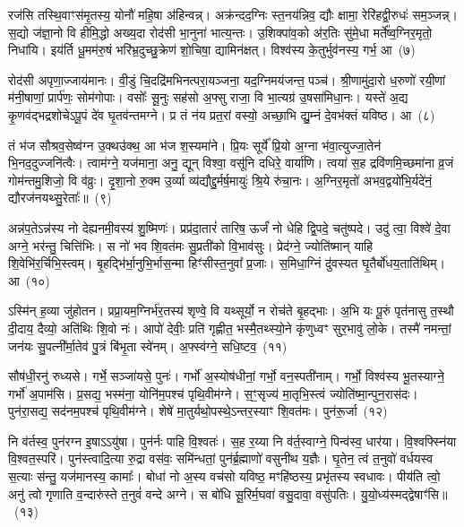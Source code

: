 रज॑सि तस्थि॒वाꣳस॑मृ॒तस्य॒ योनौ॑ महि॒षा अ॑हिन्वन्न्। अक्र॑न्दद॒ग्निः स्त॒नय॑न्निव॒ द्यौः क्षामा॒ रेरि॑हद्वी॒रुधः॑ सम॒ञ्जन्न्। स॒द्यो ज॑ज्ञा॒नो वि हीमि॒द्धो अख्य॒दा रोद॑सी भा॒नुना॑ भात्य॒न्तः। उ॒शिक्पा॑व॒को अ॑र॒तिः सु॑मे॒धा मर्ते᳚ष्व॒ग्निर॒मृतो॒ निधा॑यि। इय॑र्ति धू॒मम॑रु॒षं भरि॑भ्र॒दुच्छु॒क्रेण॑ शो॒चिषा॒ द्यामिन॑क्षत्। विश्व॑स्य के॒तुर्भुव॑नस्य॒ गर्भ॒ आ~(७)\ip

रोद॑सी अपृणा॒ज्जाय॑मानः। वी॒डुं चि॒दद्रि॑मभिनत्परा॒यञ्जना॒ यद॒ग्निमय॑जन्त॒ पञ्च॑। श्री॒णामु॑दा॒रो ध॒रुणो॑ रयी॒णां म॑नी॒षाणां॒ प्रार्प॑णः॒ सोम॑गोपाः। वसोः᳚ सू॒नुः सह॑सो अ॒फ्सु राजा॒ वि भा॒त्यग्र॑ उ॒षसा॑मिधा॒नः। यस्ते॑ अ॒द्य कृ॒णव॑द्भद्रशोचे\-ऽपू॒पं दे॑व घृ॒तव॑न्तमग्ने। प्र तं न॑य प्रत॒रां वस्यो॒ अच्छा॒भि द्यु॒म्नं दे॒वभ॑क्तं यविष्ठ। आ~(८)\ip

तं भ॑ज सौश्रव॒सेष्व॑ग्न उ॒क्थउ॑क्थ॒ आ भ॑ज श॒स्यमा॑ने। प्रि॒यः सूर्ये᳚ प्रि॒यो अ॒ग्ना भ॑वा॒त्युज्जा॒तेन॑ भि॒नद॒दुज्जनि॑त्वैः। त्वाम॑ग्ने॒ यज॑माना॒ अनु॒ द्यून् विश्वा॒ वसू॑नि दधिरे॒ वार्या॑णि। त्वया॑ स॒ह द्रवि॑णमि॒च्छमा॑ना व्र॒जं गोम॑न्तमु॒शिजो॒ वि व॑व्रुः। दृ॒शा॒नो रु॒क्म उ॒र्व्या व्य॑द्यौद्दु॒र्मर्\mbox{}ष॒मायुः॑ श्रि॒ये रु॑चा॒नः। अ॒ग्निर॒मृतो॑ अभव॒द्वयो॑भि॒र्यदे॑नं॒ द्यौरज॑नयथ्सु॒रेताः᳚॥~(९)\ip

{\anuvakamend[{तृ॒तीये᳚ त्वा॒ गर्भ॒ आ य॑वि॒ष्ठा यच्च॒त्वारि॑ च}]}

अन्न॑प॒ते\-ऽन्न॑स्य नो देह्यनमी॒वस्य॑ शु॒ष्मिणः॑। प्रप्र॑दा॒तारं॑ तारिष॒ ऊर्जं॑ नो धेहि द्वि॒पदे॒ चतु॑ष्पदे। उदु॑ त्वा॒ विश्वे॑ दे॒वा अग्ने॒ भर॑न्तु॒ चित्ति॑भिः। स नो॑ भव शि॒वत॑मः सु॒प्रती॑को वि॒भाव॑सुः। प्रेद॑ग्ने॒ ज्योति॑ष्मान् याहि शि॒वेभि॑र॒र्चिभि॒स्त्वम्। बृ॒हद्भि॑र्भा॒नुभि॒र्भास॒न्मा हिꣳ॑सीस्त॒नुवा᳚ प्र॒जाः। स॒मिधा॒ग्निं दु॑वस्यत घृ॒तैर्बो॑धय॒ताति॑थिम्। आ~(१०)\ip

ऽस्मि॑न् ह॒व्या जु॑होतन। प्रप्रा॒यम॒ग्निर्भ॑र॒तस्य॑ शृण्वे॒ वि यथ्सूर्यो॒ न रोच॑ते बृ॒हद्भाः। अ॒भि यः पू॒रुं पृत॑नासु त॒स्थौ दी॒दाय॒ दैव्यो॒ अति॑थिः शि॒वो नः॑। आपो॑ देवीः॒ प्रति॑ गृह्णीत॒ भस्मै॒तथ्स्यो॒ने कृ॑णुध्वꣳ सुर॒भावु॑ लो॒के। तस्मै॑ नमन्तां॒ जन॑यः सु॒पत्नी᳚र्मा॒तेव॑ पु॒त्रं बि॑भृ॒ता स्वे॑नम्। अ॒फ्स्व॑ग्ने॒ सधि॒ष्टव॒~(११)\ip

सौष॑धी॒रनु॑ रुध्यसे। गर्भे॒ सञ्जा॑यसे॒ पुनः॑। गर्भो॑ अ॒स्योष॑धीनां॒ गर्भो॒ वन॒स्पती॑नाम्। गर्भो॒ विश्व॑स्य भू॒तस्याग्ने॒ गर्भो॑ अ॒पाम॑सि। प्र॒सद्य॒ भस्म॑ना॒ योनि॑म॒पश्च॑ पृथि॒वीम॑ग्ने। स॒ꣳ॒सृज्य॑ मा॒तृभि॒स्त्वं ज्योति॑ष्मा॒न्पुन॒रास॑दः। पुन॑रा॒सद्य॒ सद॑नम॒पश्च॑ पृथि॒वीम॑ग्ने। शेषे॑ मा॒तुर्यथो॒पस्थे॒\-ऽन्तर॒स्याꣳ शि॒वत॑मः। पुन॑रू॒र्जा~(१२)\ip

नि व॑र्तस्व॒ पुन॑रग्न इ॒षा\-ऽऽ\-यु॑षा। पुन॑र्नः पाहि वि॒श्वतः॑। स॒ह र॒य्या नि व॑र्त॒स्वाग्ने॒ पिन्व॑स्व॒ धार॑या। वि॒श्वफ्स्नि॑या वि॒श्वत॒स्परि॑। पुन॑स्त्वादि॒त्या रु॒द्रा वस॑वः॒ समि॑न्धतां॒ पुन॑र्ब्र॒ह्माणो॑ वसुनीथ य॒ज्ञैः। घृ॒तेन॒ त्वं त॒नुवो॑ वर्धयस्व स॒त्याः स॑न्तु॒ यज॑मानस्य॒ कामाः᳚। बोधा॑ नो अ॒स्य वच॑सो यविष्ठ॒ मꣳहि॑ष्ठस्य॒ प्रभृ॑तस्य स्वधावः। पीय॑ति त्वो॒ अनु॑ त्वो गृणाति व॒न्दारु॑स्ते त॒नुवं॑ वन्दे अग्ने। स बो॑धि सू॒रिर्म॒घवा॑ वसु॒दावा॒ वसु॑पतिः। यु॒यो॒ध्य॑स्मद्द्वेषाꣳ॑सि॥~(१३)\ip


